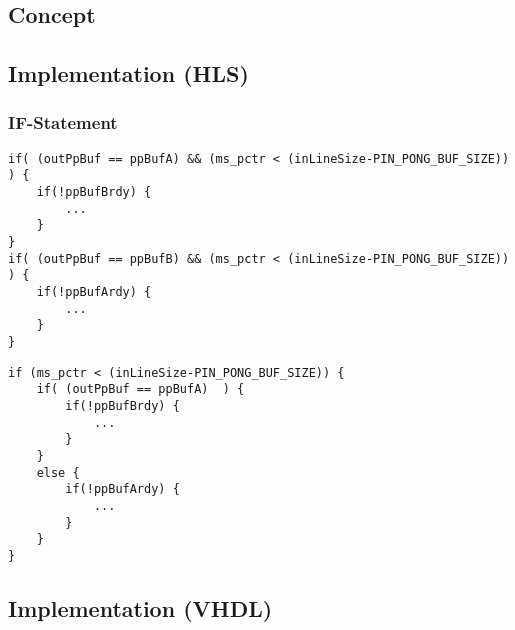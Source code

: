 \subsection{Concept}

\subsection{Implementation (HLS)}


\subsubsection*{IF-Statement} \label{ch:data:if}

\begin{minipage}{\textwidth}
\begin{lstlisting}[style=CStyle, caption=Buffer switching reloading without else statement, label=lst:buf_false]
if( (outPpBuf == ppBufA) && (ms_pctr < (inLineSize-PIN_PONG_BUF_SIZE)) ) {
    if(!ppBufBrdy) {
        ...
    }
}
if( (outPpBuf == ppBufB) && (ms_pctr < (inLineSize-PIN_PONG_BUF_SIZE)) ) {
    if(!ppBufArdy) {
        ...
    }
}
\end{lstlisting}
\end{minipage}

\begin{minipage}{\textwidth}
\begin{lstlisting}[style=CStyle, caption=Buffer switching reloading with else statement, label=lst:buf_right]
if (ms_pctr < (inLineSize-PIN_PONG_BUF_SIZE)) {
	if( (outPpBuf == ppBufA)  ) {
		if(!ppBufBrdy) {
			...
		}
	}
	else {
		if(!ppBufArdy) {
			...
		}
	}
}
\end{lstlisting}
\end{minipage}

\subsection{Implementation (VHDL)}
